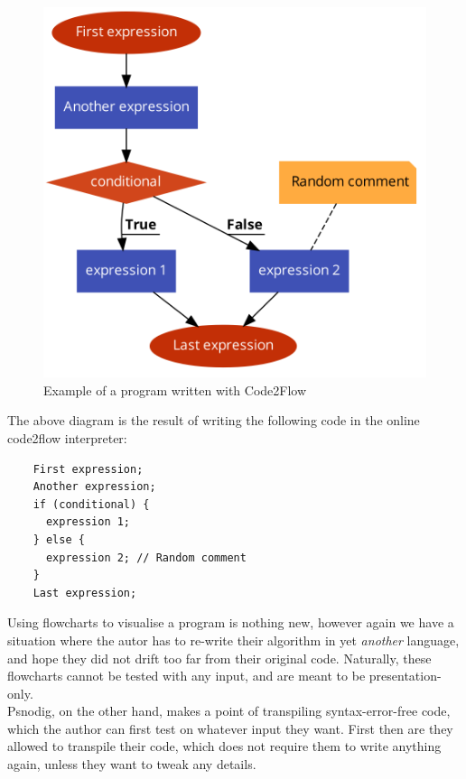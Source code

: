 \begin{figure}[ht]
    \centering
    \includegraphics[scale=0.2]{assets/code2flow_example.png}
    \caption{Example of a program written with Code2Flow}
    \label{fig:enter-label}
\end{figure}

The above diagram is the result of writing the following code in the online code2flow interpreter:

\begin{lstlisting}
    First expression;
    Another expression;
    if (conditional) {
      expression 1;
    } else {
      expression 2; // Random comment
    }
    Last expression;
\end{lstlisting}

Using flowcharts to visualise a program is nothing new, however again we have a situation where the autor has to re-write their algorithm in yet \textit{another} language, and hope they did not drift too far from their original code. Naturally, these flowcharts cannot be tested with any input, and are meant to be presentation-only. \hfill \\

Psnodig, on the other hand, makes a point of transpiling syntax-error-free code, which the author can first test on whatever input they want. First then are they allowed to transpile their code, which does not require them to write anything again, unless they want to tweak any details.

